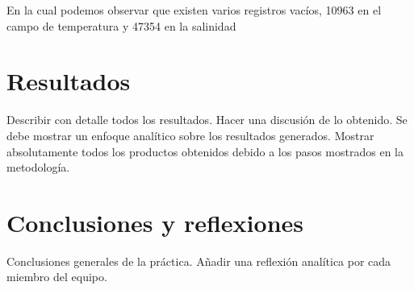 \documentclass[sigconf]{acmart}
\begin{document}
En la cual podemos observar que existen varios registros vacíos, 10963 en el campo de temperatura y 47354 en la salinidad

\section{Resultados}

Describir con detalle todos los resultados. Hacer una discusi{\'o}n de lo obtenido. Se debe mostrar un enfoque anal{\'i}tico sobre los resultados generados. Mostrar absolutamente todos los productos obtenidos debido a los pasos mostrados en la metodolog{\'i}a.

\section{Conclusiones y reflexiones}

Conclusiones generales de la pr{\'a}ctica. A\~nadir una reflexi{\'o}n anal{\'i}tica por cada miembro del equipo.



\end{document}
